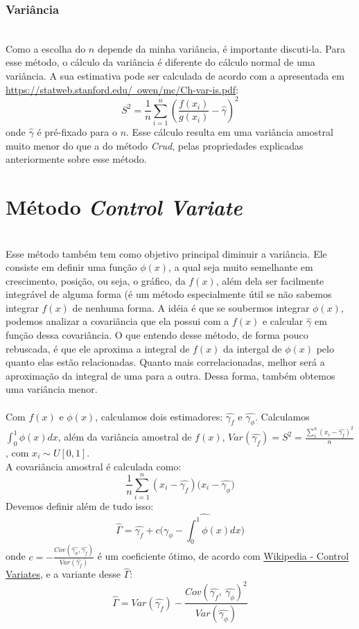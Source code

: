 \documentclass[pt12]{article}
\begin{document}
\subsubsection{Variância}
\ \\

Como a escolha do $n$ depende da minha variância, é importante discuti-la. Para esse método, o cálculo da variância é diferente do cálculo normal de uma variância.
A sua estimativa pode ser calculada de acordo com a apresentada em \href{https://statweb.stanford.edu/~owen/mc/Ch-var-is.pdf}{https://statweb.stanford.edu/~owen/mc/Ch-var-is.pdf}:
$$S^2 = \frac{1}{n}\sum_{i=1}^{n}\left(\frac{f(x_i)}{g(x_i)}-\hat{\gamma}\right)^2$$
onde $\hat{\gamma}$ é pré-fixado para o $n$. Esse cálculo resulta em uma variância amostral muito menor do que a do método \textit{Crud}, pelas propriedades explicadas anteriormente sobre esse método.
\ \\


\section{Método \textit{Control Variate}}
\ \\

Esse método também tem como objetivo principal diminuir a variância. Ele consiste em definir uma função $\phi(x)$, a qual seja muito semelhante em crescimento, posição, ou seja, o gráfico, da $f(x)$, além dela ser facilmente integrável de alguma forma (é um método especialmente útil se não sabemos integrar $f(x)$ de nenhuma forma. A idéia é que se soubermos integrar $\phi(x)$, podemos analizar a covariância que ela possui com a $f(x)$ e calcular $\hat{\gamma}$ em função dessa covariância. O que entendo desse método, de forma pouco rebuscada, é que ele aproxima a integral de $f(x)$ da intergal de $\phi(x)$ pelo quanto elas estão relacionadas. Quanto mais correlacionadas, melhor será a aproximação da integral de uma para a outra. Dessa forma, também obtemos uma variância menor.\\
\ \\

Com $f(x)$ e $\phi(x)$, calculamos dois estimadores: $\hat{\gamma_{f}}$ e $\hat{\gamma_{\phi}}$. Calculamos $\displaystyle{\int_{0}^{1}\phi(x)dx}$, além da variância amostral de $f(x)$, $Var(\hat{\gamma_f}) = S^2 = \frac{\sum_{1}^{n}(x_i - \hat{\gamma_f})^2}{n}$, com $x_i \sim U[0,1]$.\\
A covariância amostral é calculada como:
$$\displaystyle{\frac{1}{n}\sum_{i=1}^{n}(x_i - \hat{\gamma_f})(x_i -\hat{\gamma_{\phi}}})$$
Devemos definir além de tudo isso:
$$\hat{\Gamma} = \hat{\gamma_f} +c(\hat{\gamma_{\phi}-\int_{0}^{1}\phi(x)dx)}$$
onde $\displaystyle{c = -\frac{Cov(\hat{\gamma_\phi},\hat{\gamma_{f}})}{Var(\hat{\gamma_{f}})}}$ é um coeficiente ótimo, de acordo com \href{https://en.wikipedia.org/wiki/Control_variates}{Wikipedia - Control Variates}, e a variante desse $\hat{\Gamma}$:
$$\hat{\Gamma} = Var(\hat{\gamma_f}) - \frac{Cov(\hat{\gamma_f},\ \hat{\gamma_{\phi}})^2}{Var(\hat{\gamma_{\phi}})}$$
\end{document}
